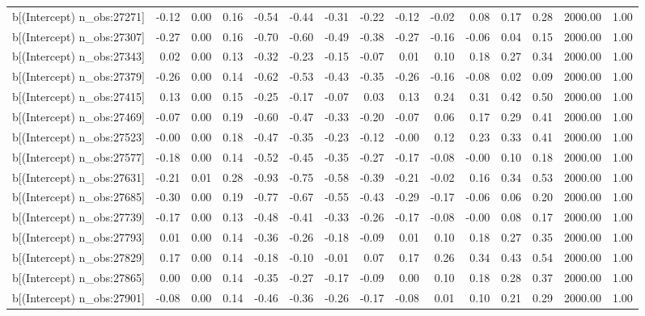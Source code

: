 \begin{table}[ht]
\begin{tabular}{rrrrrrrrrrrrrrr}
  b[(Intercept) n\_obs:27271] & -0.12 & 0.00 & 0.16 & -0.54 & -0.44 & -0.31 & -0.22 & -0.12 & -0.02 & 0.08 & 0.17 & 0.28 & 2000.00 & 1.00 \\ 
  b[(Intercept) n\_obs:27307] & -0.27 & 0.00 & 0.16 & -0.70 & -0.60 & -0.49 & -0.38 & -0.27 & -0.16 & -0.06 & 0.04 & 0.15 & 2000.00 & 1.00 \\ 
  b[(Intercept) n\_obs:27343] & 0.02 & 0.00 & 0.13 & -0.32 & -0.23 & -0.15 & -0.07 & 0.01 & 0.10 & 0.18 & 0.27 & 0.34 & 2000.00 & 1.00 \\ 
  b[(Intercept) n\_obs:27379] & -0.26 & 0.00 & 0.14 & -0.62 & -0.53 & -0.43 & -0.35 & -0.26 & -0.16 & -0.08 & 0.02 & 0.09 & 2000.00 & 1.00 \\ 
  b[(Intercept) n\_obs:27415] & 0.13 & 0.00 & 0.15 & -0.25 & -0.17 & -0.07 & 0.03 & 0.13 & 0.24 & 0.31 & 0.42 & 0.50 & 2000.00 & 1.00 \\ 
  b[(Intercept) n\_obs:27469] & -0.07 & 0.00 & 0.19 & -0.60 & -0.47 & -0.33 & -0.20 & -0.07 & 0.06 & 0.17 & 0.29 & 0.41 & 2000.00 & 1.00 \\ 
  b[(Intercept) n\_obs:27523] & -0.00 & 0.00 & 0.18 & -0.47 & -0.35 & -0.23 & -0.12 & -0.00 & 0.12 & 0.23 & 0.33 & 0.41 & 2000.00 & 1.00 \\ 
  b[(Intercept) n\_obs:27577] & -0.18 & 0.00 & 0.14 & -0.52 & -0.45 & -0.35 & -0.27 & -0.17 & -0.08 & -0.00 & 0.10 & 0.18 & 2000.00 & 1.00 \\ 
  b[(Intercept) n\_obs:27631] & -0.21 & 0.01 & 0.28 & -0.93 & -0.75 & -0.58 & -0.39 & -0.21 & -0.02 & 0.16 & 0.34 & 0.53 & 2000.00 & 1.00 \\ 
  b[(Intercept) n\_obs:27685] & -0.30 & 0.00 & 0.19 & -0.77 & -0.67 & -0.55 & -0.43 & -0.29 & -0.17 & -0.06 & 0.06 & 0.20 & 2000.00 & 1.00 \\ 
  b[(Intercept) n\_obs:27739] & -0.17 & 0.00 & 0.13 & -0.48 & -0.41 & -0.33 & -0.26 & -0.17 & -0.08 & -0.00 & 0.08 & 0.17 & 2000.00 & 1.00 \\ 
  b[(Intercept) n\_obs:27793] & 0.01 & 0.00 & 0.14 & -0.36 & -0.26 & -0.18 & -0.09 & 0.01 & 0.10 & 0.18 & 0.27 & 0.35 & 2000.00 & 1.00 \\ 
  b[(Intercept) n\_obs:27829] & 0.17 & 0.00 & 0.14 & -0.18 & -0.10 & -0.01 & 0.07 & 0.17 & 0.26 & 0.34 & 0.43 & 0.54 & 2000.00 & 1.00 \\ 
  b[(Intercept) n\_obs:27865] & 0.00 & 0.00 & 0.14 & -0.35 & -0.27 & -0.17 & -0.09 & 0.00 & 0.10 & 0.18 & 0.28 & 0.37 & 2000.00 & 1.00 \\ 
  b[(Intercept) n\_obs:27901] & -0.08 & 0.00 & 0.14 & -0.46 & -0.36 & -0.26 & -0.17 & -0.08 & 0.01 & 0.10 & 0.21 & 0.29 & 2000.00 & 1.00 \\ 

\end{tabular}
\end{table}
